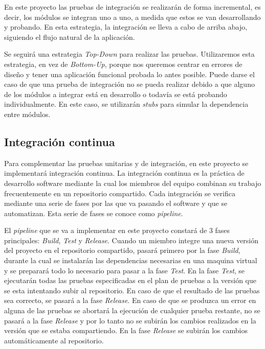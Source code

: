 En este proyecto las pruebas de integración se realizarán de forma incremental, es decir, los módulos se integran uno a uno, a medida que estos se van desarrollando y probando. En esta estrategia, la integración se lleva a cabo de arriba abajo, siguiendo el flujo natural de la aplicación.

Se seguirá una estrategia \textit{Top-Down} para realizar las pruebas. Utilizaremos esta estrategia, en vez de \textit{Bottom-Up}, porque nos queremos centrar en errores de diseño y tener una aplicación funcional probada lo antes posible.
Puede darse el caso de que una prueba de integración no se pueda realizar debido a que alguno de los módulos a integrar está en desarrollo o todavía se está probando individualmente. En este caso, se utilizarán \textit{stubs} para simular la dependencia entre módulos.
\subsection{Integración continua}
Para complementar las pruebas unitarias y de integración, en este proyecto se implementará integración continua. La integración continua es la práctica de desarrollo software mediante la cual los miembros del equipo combinan su trabajo frecuentemente en un repositorio compartido. Cada integración se verifica mediante una serie de fases por las que va pasando el software y que se automatizan. Esta serie de fases se conoce como \textit{pipeline}.

El \textit{pipeline} que se va a implementar en este proyecto constará de 3 fases principales: \textit{Build}, \textit{Test} y \textit{Release}. Cuando un miembro integre una nueva versión del proyecto en el repositorio compartido, pasará primero por la fase \textit{Build}, durante la cual se instalarán las dependencias necesarias en una maquina virtual y se preparará todo lo necesario para pasar a la fase \textit{Test}. En la fase \textit{Test}, se ejecutarán todas las pruebas especificadas en el plan de pruebas a la versión que se esta intentando subir al repositorio. En caso de que el resultado de las pruebas sea correcto, se pasará a la fase \textit{Release}. En caso de que se produzca un error en alguna de las pruebas se abortará la ejecución de cualquier prueba restante, no se pasará a la fase \textit{Release} y por lo tanto no se subirán los cambios realizados en la versión que se estaba compartiendo. En la fase \textit{Release} se subirán los cambios automáticamente al repositorio.

